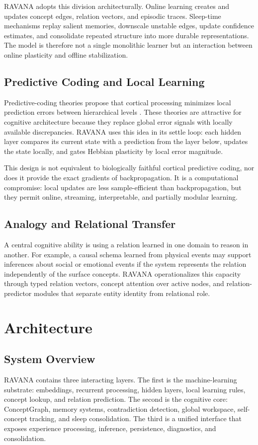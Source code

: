 \documentclass[11pt]{article}
\begin{document}
RAVANA adopts this division architecturally. Online learning creates and updates concept edges, relation vectors, and episodic traces. Sleep-time mechanisms replay salient memories, downscale unstable edges, update confidence estimates, and consolidate repeated structure into more durable representations. The model is therefore not a single monolithic learner but an interaction between online plasticity and offline stabilization.

\subsection{Predictive Coding and Local Learning}
Predictive-coding theories propose that cortical processing minimizes local prediction errors between hierarchical levels \cite{friston2010}. These theories are attractive for cognitive architecture because they replace global error signals with locally available discrepancies. RAVANA uses this idea in its settle loop: each hidden layer compares its current state with a prediction from the layer below, updates the state locally, and gates Hebbian plasticity by local error magnitude.

This design is not equivalent to biologically faithful cortical predictive coding, nor does it provide the exact gradients of backpropagation. It is a computational compromise: local updates are less sample-efficient than backpropagation, but they permit online, streaming, interpretable, and partially modular learning.

\subsection{Analogy and Relational Transfer}
A central cognitive ability is using a relation learned in one domain to reason in another. For example, a causal schema learned from physical events may support inferences about social or emotional events if the system represents the relation independently of the surface concepts. RAVANA operationalizes this capacity through typed relation vectors, concept attention over active nodes, and relation-predictor modules that separate entity identity from relational role.

\section{Architecture}
\subsection{System Overview}
RAVANA contains three interacting layers. The first is the machine-learning substrate: embeddings, recurrent processing, hidden layers, local learning rules, concept lookup, and relation prediction. The second is the cognitive core: ConceptGraph, memory systems, contradiction detection, global workspace, self-concept tracking, and sleep consolidation. The third is a unified interface that exposes experience processing, inference, persistence, diagnostics, and consolidation.
\end{document}
